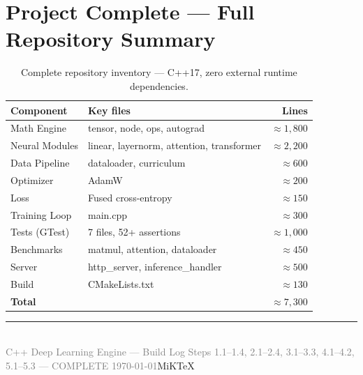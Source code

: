 \documentclass[12pt, a4paper]{article}
\begin{document}
\section*{Project Complete --- Full Repository Summary}

\begin{table}[!ht]
\centering
\renewcommand{\arraystretch}{1.4}
\begin{tabular}{@{} l l r @{}}
\toprule
\textbf{Component} & \textbf{Key files} & \textbf{Lines} \\
\midrule
Math Engine     & tensor, node, ops, autograd           & $\approx 1{,}800$ \\
Neural Modules  & linear, layernorm, attention, transformer & $\approx 2{,}200$ \\
Data Pipeline   & dataloader, curriculum                & $\approx 600$ \\
Optimizer       & AdamW                                 & $\approx 200$ \\
Loss            & Fused cross-entropy                   & $\approx 150$ \\
Training Loop   & main.cpp                              & $\approx 300$ \\
Tests (GTest)   & 7 files, 52+ assertions               & $\approx 1{,}000$ \\
Benchmarks      & matmul, attention, dataloader         & $\approx 450$ \\
Server          & http\_server, inference\_handler      & $\approx 500$ \\
Build           & CMakeLists.txt                        & $\approx 130$ \\
\midrule
\textbf{Total}  &                                       & $\approx 7{,}300$ \\
\bottomrule
\end{tabular}
\caption{Complete repository inventory --- C++17, zero external runtime dependencies.}
\end{table}


\vfill
\begin{center}
  \textcolor{accentgold}{\rule{8cm}{0.8pt}}\\[0.4em]
  {\small\textcolor{gray}%
    {C++ Deep Learning Engine --- Build Log \textbar{}
     Steps 1.1--1.4, 2.1--2.4, 3.1--3.3, 4.1--4.2, 5.1--5.3 --- COMPLETE \textbar{}
     \today}}MiKTeX
\end{center}
\end{document}
